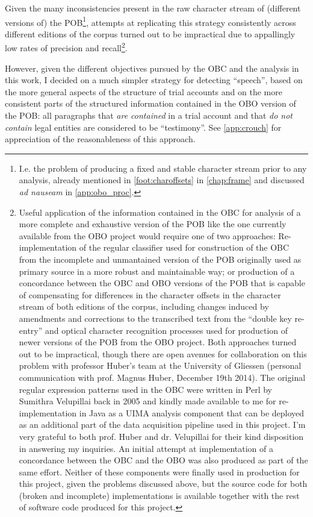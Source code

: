 Given the many inconsistencies present in the raw character stream of (different versions of) the POB\footnote{
    \label{foot:charstream}
    I.e. the problem of producing a fixed and stable character stream prior to any analysis, already mentioned in \autoref{foot:charoffsets} in \autoref{chap:frame} and discussed \textit{ad nauseam} in \autoref{app:obo_proc}.
}, attempts at replicating this strategy consistently across different editions of the corpus turned out to be impractical due to appallingly low rates of precision and recall\footnote{
    \label{foot:obcperlre}
    Useful application of the information contained in the OBC for analysis of a more complete and exhaustive version of the POB like the one currently available from the OBO project would require one of two approaches:
    Re-implementation of the regular classifier used for construction of the OBC from the incomplete and unmantained version of the POB originally used as primary source in a more robust and maintainable way; or production of a concordance between the OBC and OBO versions of the POB that is capable of compensating for differences in the character offsets in the character stream of both editions of the corpus, including changes induced by amendments and corrections to the transcribed text from the ``double key re-entry'' and optical character recognition processes used for production of newer versions of the POB from the OBO project.
    Both approaches turned out to be impractical, though there are open avenues for collaboration on this problem with professor Huber's team at the University of Gliessen (personal communication with prof. Magnus Huber, December 19th 2014).
    The original regular expression patterns used in the OBC were written in Perl by Sumithra Velupillai back in 2005 and kindly made available to me for re-implementation in Java as a UIMA analysis component that can be deployed as an additional part of the data acquisition pipeline used in this project.
    I'm very grateful to both prof. Huber and dr. Velupillai for their kind disposition in answering my inquiries.
    An initial attempt at implementation of a concordance between the OBC and the OBO was also produced as part of the same effort.
    Neither of these components were finally used in production for this project, given the problems discussed above, but the source code for both (broken and incomplete) implementations is available together with the rest of software code produced for this project.
}.

However, given the different objectives pursued by the OBC and the analysis in this work, I decided on a much simpler strategy for detecting ``speech'', based on the more general aspects of the structure of trial accounts and on the more consistent parts of the structured information contained in the OBO version of the POB: all paragraphs that \emph{are contained} in a trial account and that \emph{do not contain} legal entities are considered to be ``testimony''.
See \autoref{app:crouch} for appreciation of the reasonableness of this approach.

